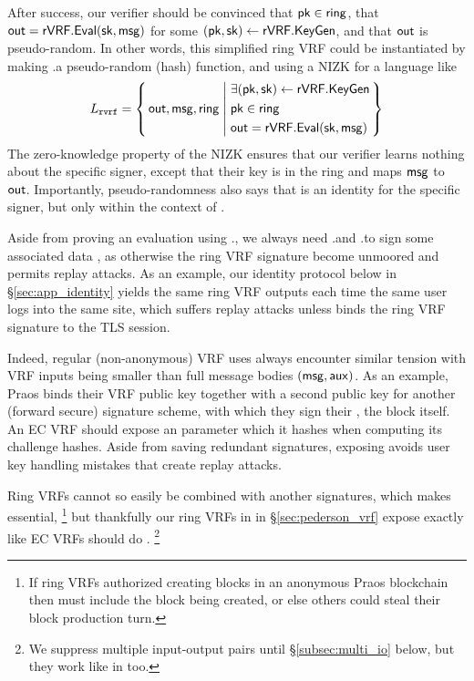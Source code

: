 After success, our verifier should be convinced that $\mathsf{pk} \in \mathsf{ring}$, that
${\mathsf{out}} = {\mathsf{rVRF}}.{\mathsf{Eval}}(\mathsf{sk},\mathsf{msg})$ for some $(\mathsf{pk},\mathsf{sk}) \leftarrow {\ensuremath{\mathsf{rVRF}}}.{\mathsf{KeyGen}}$,
 and that ${\mathsf{out}}$ is pseudo-random.
In other words, this simplified ring VRF could be instantiated by making
\rVRF.\Eval a pseudo-random (hash) function, and using a NIZK for a language like
$$ \Lrvrf = \Setst{ \Out, \msg, \ring}{
    \eprint{
        \exists (\pk,\sk) \leftarrow \rVRF.\KeyGen, \quad %
        \pk \in \ring, \quad
        \Out = \rVRF.\Eval(\sk,\msg)
    }{
        \begin{aligned}
        & \exists (\pk,\sk) \leftarrow \rVRF.\KeyGen \\
        & \pk \in \ring \\
        & \Out = \rVRF.\Eval(\sk,\msg)
        \end{aligned}
    }
} $$
The zero-knowledge property of the NIZK ensures that our verifier learns nothing about the specific
signer, except that their key is in the ring and maps $\mathsf{msg}$ to ${\mathsf{out}}$.
Importantly, pseudo-randomness also says that \Out is an identity
for the specific signer, but only within the context of \msg.


Aside from proving an evaluation using \rVRF.\Eval, 
we always need \rVRF.\Sign and \rVRF.\Verify to sign some associated data \aux,
as otherwise the ring VRF signature become unmoored and permits replay attacks.
%
As an example, our identity protocol below in \S\ref{sec:app_identity}
yields the same ring VRF outputs each time the same user logs into the
same site, which suffers replay attacks unless \aux binds the
ring VRF signature to the TLS session.

Indeed, regular (non-anonymous) VRF uses always encounter similar tension
with VRF inputs \msg being smaller than full message bodies $(\mathsf{msg},\mathsf{aux})$.
As an example, Praos \cite{praos} binds their VRF public key together
with a second public key for another (forward secure) signature scheme,
with which they sign their \aux, the block itself.
%
An EC VRF should expose an \aux parameter which it hashes when computing
its challenge hashes.  Aside from saving redundant signatures, exposing
\aux avoids user key handling mistakes that create replay attacks.

Ring VRFs cannot so easily be combined with another signatures, which
makes \aux essential,%
\footnote{If ring VRFs authorized creating blocks in an anonymous Praos blockchain then \aux must include the block being created, or else others could steal their block production turn.}
but thankfully our ring VRFs in in \S\ref{sec:pederson_vrf} expose \aux exactly like EC VRFs should do .%
\footnote{We suppress multiple input-output pairs until \S\ref{subsec:multi_io} below, but they work like in \cite{PrivacyPass} too.}

